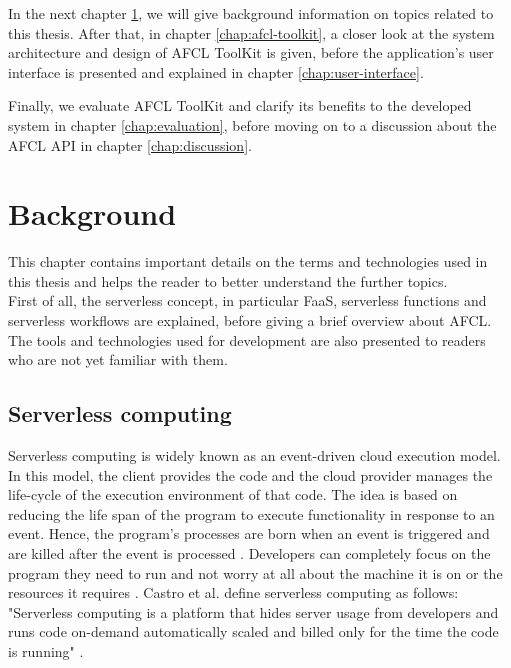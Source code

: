 \documentclass[a4paper,top=25mm,bottom=25mm,12pt,pdftex,halfparskip,twoside,openany,bibtotoc,numbers=noenddot]{scrbook}
\begin{document}
\newpage

In the next chapter \ref{chap:background}, we will give background information on topics related to this thesis. After that, in chapter \ref{chap:afcl-toolkit}, a closer look at the system architecture and design of AFCL ToolKit is given, before the application's user interface is presented and explained in chapter \ref{chap:user-interface}.

Finally, we evaluate AFCL ToolKit and clarify its benefits to the developed system in chapter \ref{chap:evaluation}, before moving on to a discussion about the AFCL API in chapter \ref{chap:discussion}.

\chapter{Background}
\label{chap:background}

This chapter contains important details on the terms and technologies used in this thesis and helps the reader to better understand the further topics.\\
First of all, the serverless concept, in particular FaaS, serverless functions and serverless workflows are explained, before giving a brief overview about AFCL. The tools and technologies used for development are also presented to readers who are not yet familiar with them.

\section{Serverless computing}

Serverless computing is widely known as an event-driven cloud execution model.
In this model, the client provides the code  and the cloud provider manages the life-cycle of the execution environment of that code.
The idea is based on reducing the life span of the program to execute functionality in response to an event. Hence, the program's processes are born when an event is triggered and are killed after the event is processed \cite{inproceedings-serverless-beyond-the-cloud-kanso}.
Developers can completely focus on the program they need to run and not worry at all about the machine it is on or the resources it requires \cite{articles-going-serverless-savage}.
Castro et al. define serverless computing as follows: "Serverless computing is a platform that hides server usage from developers and runs code on-demand automatically scaled and billed only for the time the code is running" \cite{articles-rise-of-serverless-castro}.
\end{document}

